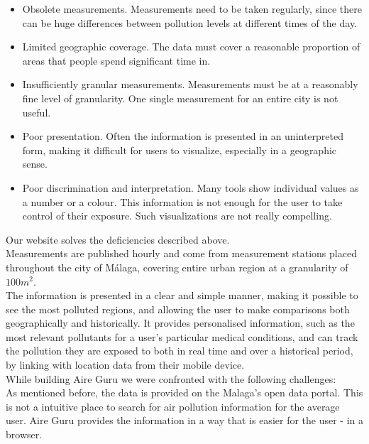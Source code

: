 \begin{itemize}

    \item Obsolete measurements. Measurements need to be taken regularly, since there can be huge differences
          between pollution levels at different times of the day.

    \item Limited geographic coverage. The data must cover a reasonable proportion of areas that people spend significant time in.

    \item Insufficiently granular measurements. Measurements must be at a reasonably fine level of granularity. One single measurement for an entire city is not useful.

    \item Poor presentation. Often the information is presented in an uninterpreted form, making it difficult for users to visualize, especially in a geographic sense.

    \item Poor discrimination and interpretation. Many tools show individual values as a number or a colour. This information is not
          enough for the user to take control of their exposure. Such visualizations are not really compelling. 

\end{itemize}

Our website solves the deficiencies described above.\\

Measurements are published hourly and come from measurement stations placed throughout the 
city of Málaga, covering entire urban region at a granularity of $100m^2$.\\

The information is presented in a clear and simple manner, making it possible to see the most polluted regions, and allowing the user to make comparisons both geographically and historically.
It provides personalised information, such as the most relevant pollutants for a user's particular medical conditions, and can track
the pollution they are exposed to both in real time and over a historical period, by linking with location data from their mobile device. \\

While building Aire Guru we were confronted with the following challenges:\\

As mentioned before, the data is provided on the Malaga's open data portal.
This is not a intuitive place to search for air pollution information for the average user.
Aire Guru provides the information in a way that is easier for the user - in a browser.\\

